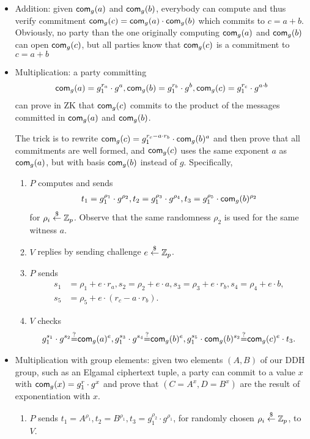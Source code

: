 \begin{itemize}
\item Addition: given $\mathsf{com}_g(a)$ and $\mathsf{com}_g(b)$, everybody can
  compute and thus verify commitment
  $\mathsf{com}_g(c)=\mathsf{com}_g(a)\cdot{}\mathsf{com}_g(b)$ which commits to
  $c=a+b$. Obviously, no party than the one originally computing
  $\mathsf{com}_g(a)$ and $\mathsf{com}_g(b)$ can open $\mathsf{com}_g(c)$, but all parties
  know that $\mathsf{com}_g(c)$ is a commitment to $c=a+b$
  
\item Multiplication: a party committing
  \begin{align*}
  \mathsf{com}_g(a)=g_1^{r_a}\cdot{}g^a, \mathsf{com}_g(b)=g_1^{r_b}\cdot{}g^b,
  \mathsf{com}_g(c)=g_1^{r_c}\cdot{}g^{a\cdot{}b}
  \end{align*}
  can prove in ZK that
  $\mathsf{com}_g(c)$ commits to the product of the messages committed in
  $\mathsf{com}_g(a)$ and $\mathsf{com}_g(b)$.

  The trick is to rewrite
  $\mathsf{com}_g(c)=g_1^{r_c-a\cdot{}r_b}\cdot\mathsf{com}_g(b)^{a}$ and then prove
  that all commitments are well formed, and $\mathsf{com}_g(c)$ uses the same
  exponent $a$ as $\mathsf{com}_g(a)$, but with basis $\mathsf{com}_g(b)$ instead of
  $g$. Specifically,
  \begin{enumerate}
  \item $P$ computes and sends
    \begin{align*}
      t_1=g_1^{\rho_1}\cdot{}g^{\rho_2},
      t_2=g_1^{\rho_3}\cdot{}g^{\rho_4},
      t_3=g_1^{\rho_5}\cdot{}\mathsf{com}_g(b)^{\rho_2}
      \end{align*}
      for $\rho_i\stackrel{\$}{\leftarrow}\mathbb{Z}_p$. Observe that the same randomness $\rho_2$
      is used for the same witness $a$.
    \item $V$ replies by sending challenge $e\stackrel{\$}{\leftarrow}\mathbb{Z}_p$.
    \item $P$ sends
      \begin{align*}
        s_1&=\rho_1+e\cdot{}r_a,s_2=\rho_2+e\cdot{}a,s_3=\rho_3+e\cdot{}r_b,s_4=\rho_4+e\cdot{}b,\\s_5&=\rho_5+e\cdot{}(r_c-a\cdot{}r_b).
        \end{align*}
    \item $V$ checks
      \begin{align*}
        g_1^{s_1}\cdot{}g^{s_2}{\stackrel{?}{=}}{}\mathsf{com}_g(a)^e, g_1^{s_3}\cdot{}g^{s_4}{\stackrel{?}{=}}{}\mathsf{com}_g(b)^e, g_1^{s_5}\cdot{}\mathsf{com}_g(b)^{s_2}{\stackrel{?}{=}}{}\mathsf{com}_g(c)^e\cdot{}t_3.
        \end{align*}
\end{enumerate}

  \item Multiplication with group elements: given two elements $(A,B)$
    of our DDH group, such as an Elgamal ciphertext tuple, a party can
    commit to a value $x$ with $\mathsf{com}_g(x) =g_1^r\cdot{}g^x$ and prove
    that $(C=A^x,D=B^x)$ are the result of exponentiation with $x$.
    \begin{enumerate}
      \item $P$ sends $t_1=A^{\rho_1},t_2=B^{\rho_1},
        t_3=g_1^{\rho_2}\cdot{}g^{\rho_1}$, for randomly chosen
        $\rho_i\stackrel{\$}{\leftarrow}\mathbb{Z}_p$, to $V$.


\end{enumerate}
\end{itemize}
